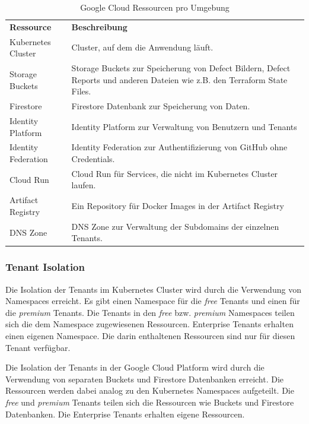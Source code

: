\renewcommand{\arraystretch}{1.5}
{
\begin{longtable}{l p{10cm}}
  \caption{Google Cloud Ressourcen pro Umgebung}
  \label{tab:google-cloud-ressourcen} \\
  \textbf{Ressource} & \textbf{Beschreibung} \\ [1ex]
  Kubernetes Cluster & Cluster, auf dem die Anwendung läuft. \\ [0.5ex]
  Storage Buckets  & Storage Buckets zur Speicherung von Defect Bildern, Defect Reports und anderen Dateien wie z.B. den Terraform State Files. \\ [0.5ex]
  Firestore & Firestore Datenbank zur Speicherung von Daten. \\ [0.5ex]
  Identity Platform & Identity Platform zur Verwaltung von Benutzern und Tenants \\ [0.5ex]
  Identity Federation & Identity Federation zur Authentifizierung von GitHub ohne Credentials. \\ [0.5ex]
  Cloud Run & Cloud Run für Services, die nicht im Kubernetes Cluster laufen. \\ [0.5ex]
  Artifact Registry & Ein Repository für Docker Images in der Artifact Registry \\ [0.5ex]
  DNS Zone & DNS Zone zur Verwaltung der Subdomains der einzelnen Tenants. \\ [0.5ex]
\end{longtable}}

\subsubsection{Tenant Isolation}

Die Isolation der Tenants im Kubernetes Cluster wird durch die Verwendung von Namespaces erreicht.
Es gibt einen Namespace für die \textit{free} Tenants und einen für die \textit{premium} Tenants.
Die Tenants in den \textit{free} bzw. \textit{premium} Namespaces teilen sich die dem Namespace zugewiesenen Ressourcen.
Enterprise Tenants erhalten einen eigenen Namespace. 
Die darin enthaltenen Ressourcen sind nur für diesen Tenant verfügbar.

Die Isolation der Tenants in der Google Cloud Platform wird durch die Verwendung von 
separaten Buckets und Firestore Datenbanken erreicht. Die Ressourcen werden dabei 
analog zu den Kubernetes Namespaces aufgeteilt. Die \textit{free} und \textit{premium} Tenants
teilen sich die Ressourcen wie Buckets und Firestore Datenbanken. Die Enterprise Tenants
erhalten eigene Ressourcen.

